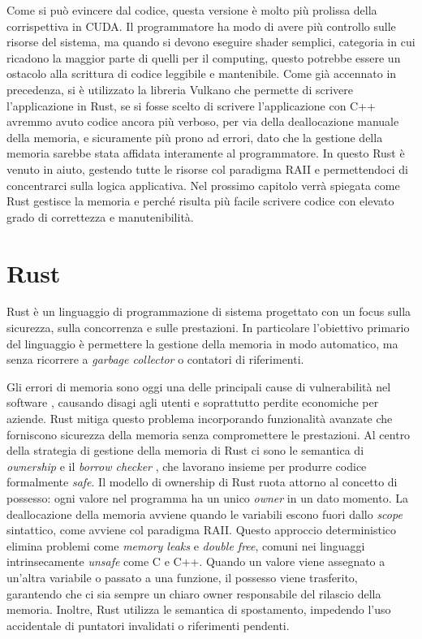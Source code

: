 Come si può evincere dal codice, questa versione è molto più prolissa della corrispettiva in \gls{CUDA}. Il programmatore ha modo di avere più controllo sulle risorse del sistema, ma quando si devono eseguire shader semplici, categoria in cui ricadono la maggior parte di quelli per il computing, questo potrebbe essere un ostacolo alla scrittura di codice leggibile e mantenibile. Come già accennato in precedenza, si è utilizzato la libreria Vulkano che permette di scrivere l'applicazione in Rust, se si fosse scelto di scrivere l'applicazione con C++ avremmo avuto codice ancora più verboso, per via della deallocazione manuale della memoria, e sicuramente più prono ad errori, dato che la gestione della memoria sarebbe stata affidata interamente al programmatore. In questo Rust è venuto in aiuto, gestendo tutte le risorse col paradigma \gls{RAII} e permettendoci di concentrarci sulla logica applicativa. Nel prossimo capitolo verrà spiegata come Rust gestisce la memoria e perché risulta più facile scrivere codice con elevato grado di correttezza e manutenibilità.

\section[Rust]{Rust}

Rust è un linguaggio di programmazione di sistema progettato con un focus sulla sicurezza, sulla concorrenza e sulle prestazioni. In particolare l'obiettivo primario del linguaggio è permettere la gestione della memoria in modo automatico, ma senza ricorrere a \textit{garbage collector} o contatori di riferimenti.

Gli errori di memoria sono oggi una delle principali cause di vulnerabilità nel software \cite[]{Mic:memory_safety}, causando disagi agli utenti e soprattutto perdite economiche per aziende. Rust mitiga questo problema incorporando funzionalità avanzate che forniscono sicurezza della memoria senza compromettere le prestazioni. Al centro della strategia di gestione della memoria di Rust ci sono le semantica di \textit{ownership} e il \textit{borrow checker} \cite[]{Rust:borrow_checker}, che lavorano insieme per produrre codice formalmente \textit{safe}. Il modello di ownership di Rust ruota attorno al concetto di possesso: ogni valore nel programma ha un unico \textit{owner} in un dato momento. La deallocazione della memoria avviene quando le variabili escono fuori dallo \textit{scope} sintattico, come avviene col paradigma \gls{RAII}. Questo approccio deterministico elimina problemi come \textit{memory leaks} e \textit{double free}, comuni nei linguaggi intrinsecamente \textit{unsafe} come C e C++. Quando un valore viene assegnato a un'altra variabile o passato a una funzione, il possesso viene trasferito, garantendo che ci sia sempre un chiaro owner responsabile del rilascio della memoria. Inoltre, Rust utilizza le semantica di spostamento, impedendo l'uso accidentale di puntatori invalidati o riferimenti pendenti.

